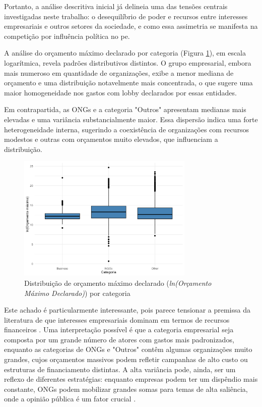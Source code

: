 Portanto, a análise descritiva inicial já delineia uma das tensões centrais investigadas neste trabalho: o desequilíbrio de poder e recursos entre interesses empresariais e outros setores da sociedade, e como essa assimetria se manifesta na competição por influência política no \acrshort{pe}.


A análise do orçamento máximo declarado por categoria (Figura \ref{fig:budget_ln_boxplot}), em escala logarítmica, revela padrões distributivos distintos. O grupo empresarial, embora mais numeroso em quantidade de organizações, exibe a menor mediana de orçamento e uma distribuição notavelmente mais concentrada, o que sugere uma maior homogeneidade nos gastos com lobby declarados por essas entidades.

Em contrapartida, as ONGs e a categoria "Outros" apresentam medianas mais elevadas e uma variância substancialmente maior. Essa dispersão indica uma forte heterogeneidade interna, sugerindo a coexistência de organizações com recursos modestos e outras com orçamentos muito elevados, que influenciam a distribuição.

\begin{figure}[!htbp]
\centering
\includegraphics[width=0.75\textwidth]{figures/descriptives_lobbyists/boxplot_max_budget_by_category.png}
\caption{Distribuição de orçamento máximo declarado (\textit{ln(Orçamento Máximo Declarado)}) por categoria}
\label{fig:budget_ln_boxplot}
\end{figure}

Este achado é particularmente interessante, pois parece tensionar a premissa da literatura de que interesses empresariais dominam em termos de recursos financeiros \cite{de_figueiredo_advancing_2014, dur20212wholobbies}. Uma interpretação possível é que a categoria empresarial seja composta por um grande número de atores com gastos mais padronizados, enquanto as categorias de ONGs e "Outros" contêm algumas organizações muito grandes, cujos orçamentos massivos podem refletir campanhas de alto custo ou estruturas de financiamento distintas. A alta variância pode, ainda, ser um reflexo de diferentes estratégias: enquanto empresas podem ter um dispêndio mais constante, ONGs podem mobilizar grandes somas para temas de alta saliência, onde a opinião pública é um fator crucial \cite{mahoney_lobbying_2007}.

